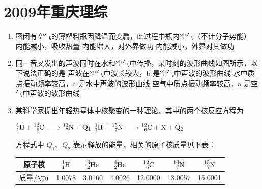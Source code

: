 \documentclass[\gkver]{gaokaozhenti}
\begin{document}
\chapter{2009年重庆理综}

\begin{enumerate}
\item
密闭有空气的薄塑料瓶因降温而变扁，此过程中瓶内空气（不计分子势能）
{内能减小，吸收热量}
{内能增大，对外界做功}
{内能减小，外界对其做功}


\item
同一音叉发出的声波同时在水和空气中传播，某时刻的波形曲线如图所示，以下说法正确的是
{声波在空气中波长较大，b 是空气中声波的波形曲线}
{水中质点振动频率较高，a 是水中声波的波形曲线}
{空气中质点振动频率较高，a 是空气中声波的波形曲线}


\item
某科学家提出年轻热星体中核聚变的一种理论，其中的两个核反应方程为

$\ce{^1_1H + ^12_6C -> ^13_7N + Q_1}$ \qquad $\ce{^1_1H + ^15_7N -> ^12_6C + X + Q_2}$

方程式中 $Q_{1}$、$Q_{2}$ 表示释放的能量，相关的原子核质量见下表：

\begin{center}
\begin{tabular}{|c|c|c|c|c|c|c|}
\hline
原子核 & $\ce{^1_1H}$ & $\ce{^3_2He}$ & $\ce{^4_2He}$ & $\ce{^12_6C}$ & $\ce{^13_7N}$ & $\ce{^15_7N}$ \\
\hline
质量/$\Uu$ & 1.0078 & 3.0160 & 4.0026 & 12.0000 & 13.0057 & 15.0001 \\
\hline
\end{tabular}
\end{center}


\end{enumerate}
\end{document}
